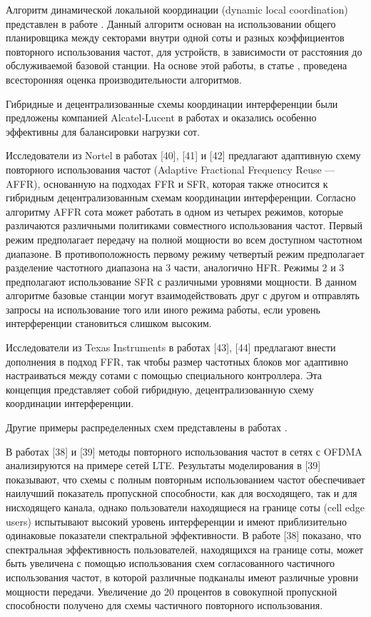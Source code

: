 Алгоритм динамической локальной координации (dynamic local coordination) представлен в работе \cite{sternad2003attaining}. Данный алгоритм основан на использовании общего планировщика между секторами внутри одной соты и разных коэффициентов повторного использования частот, для устройств, в зависимости от расстояния до обслуживаемой базовой станции. На основе этой работы, в статье \cite{necker2007local}, проведена всесторонняя оценка производительности алгоритмов.

Гибридные и децентрализованные схемы координации интерференции были предложены компанией Alcatel-Lucent в работах \todo{[37-39]} \cite{R1-050407,R4-092042,R1-081873} и оказались особенно эффективны для балансировки нагрузки сот.

Исследователи из Nortel в работах [40], [41] и [42] предлагают адаптивную схему повторного использования частот (Adaptive Fractional Frequency Reuse — AFFR), основанную на подходах FFR и SFR, которая также относится к гибридным децентрализованным схемам координации интерференции. Согласно алгоритму AFFR сота может работать в одном из четырех режимов, которые различаются различными политиками совместного использования частот. Первый режим предполагает передачу на полной мощности во всем доступном частотном диапазоне. В противоположность первому режиму четвертый режим предполагает разделение частотного диапазона на 3 части, аналогично HFR. Режимы 2 и 3 предполагают использование SFR с различными уровнями мощности. В данном алгоритме базовые станции могут взаимодействовать друг с другом и отправлять запросы на использование того или иного режима работы, если уровень интерференции становиться слишком высоким.

Исследователи из Texas Instruments в работах [43], [44] предлагают внести дополнения в подход FFR, так чтобы размер частотных блоков мог адаптивно настраиваться между сотами с помощью специального контроллера. Эта концепция представляет собой гибридную, децентрализованную схему координации интерференции.

Другие примеры распределенных схем представлены в работах \cite{rahman2008interference}\cite{li2006downlink}.

В работах [38] и [39] методы повторного использования частот в сетях с OFDMA анализируются на примере сетей LTE. Результаты моделирования в [39] показывают, что схемы с полным повторным использованием частот обеспечивает наилучший показатель пропускной способности, как для восходящего, так и для нисходящего канала, однако пользователи находящиеся на границе соты (cell edge users) испытывают высокий уровень интерференции и имеют приблизительно одинаковые показатели спектральной эффективности. В работе [38] показано, что спектральная эффективность пользователей, находящихся на границе соты, может быть увеличена с помощью использования схем согласованного частичного использования частот, в которой различные подканалы имеют различные уровни мощности передачи. Увеличение до 20 процентов в совокупной пропускной способности получено для схемы частичного повторного использования.


